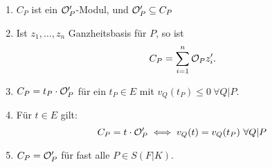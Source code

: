 \begin{satz}
    \begin{enumerate}[label=(\alph*)]
        \item $C_P$ ist ein $\mathcal{O}'_P$-Modul, und $\mathcal{O}'_P \subseteq C_P$
        \item Ist $z_1,\ldots,z_n$ Ganzheitsbasis für $P$, so ist 
        $$ C_P = \sum\limits_{i=1}^n \mathcal{O}_P z'_i.$$

        \item $C_P = t_P \cdot \mathcal{O}'_P$ für ein $t_P \in E$ mit $v_Q(t_P) \leq 0~ \forall Q|P$.
        \item Für $t \in E$ gilt:
        $$ C_P = t\cdot\mathcal{O}'_P \iff v_Q(t) = v_Q(t_P)~ \forall Q|P$$

        \item $C_P = \mathcal{O}'_P$ für fast alle $P \in S(F|K)$.
    \end{enumerate}
\end{satz}
